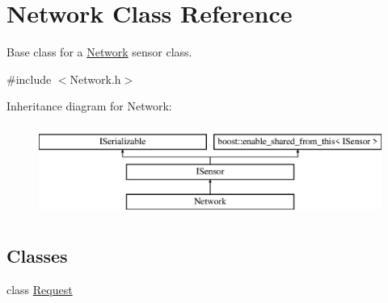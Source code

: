 \hypertarget{class_network}{}\section{Network Class Reference}
\label{class_network}


Base class for a \hyperlink{class_network}{Network} sensor class.  




{\ttfamily \#include $<$Network.\+h$>$}

Inheritance diagram for Network\+:\begin{figure}[H]
\begin{center}
\leavevmode
\includegraphics[height=3.000000cm]{class_network}
\end{center}
\end{figure}
\subsection*{Classes}
\begin{DoxyCompactItemize}
\item 
class \hyperlink{class_network_1_1_request}{Request}
\end{DoxyCompactItemize}
